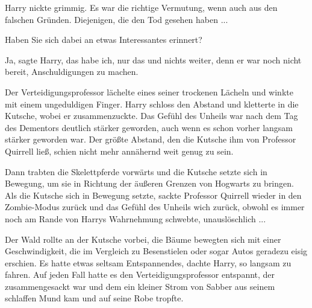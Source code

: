 Harry nickte grimmig. Es war die richtige Vermutung, wenn auch aus den falschen
Gründen. Diejenigen, die den Tod gesehen haben ...

\glqq{}Haben Sie sich dabei an etwas Interessantes erinnert?\grqq{}

\glqq{}Ja\grqq{}, sagte Harry, \glqq{}das habe ich\grqq{}, nur das und nichts
weiter, denn er war noch nicht bereit, Anschuldigungen zu machen.

Der Verteidigungsprofessor lächelte eines seiner trockenen Lächeln und winkte
mit einem ungeduldigen Finger. Harry schloss den Abstand und kletterte in die
Kutsche, wobei er zusammenzuckte. Das Gefühl des Unheils war nach dem Tag des
Dementors deutlich stärker geworden, auch wenn es schon vorher langsam stärker
geworden war. Der größte Abstand, den die Kutsche ihm von Professor Quirrell
ließ, schien nicht mehr annähernd weit genug zu sein.

Dann trabten die Skelettpferde vorwärts und die Kutsche setzte sich in Bewegung,
um sie in Richtung der äußeren Grenzen von Hogwarts zu bringen. Als die Kutsche
sich in Bewegung setzte, sackte Professor Quirrell wieder in den Zombie-Modus
zurück und das Gefühl des Unheils wich zurück, obwohl es immer noch am Rande von
Harrys Wahrnehmung schwebte, unauslöschlich ...

Der Wald rollte an der Kutsche vorbei, die Bäume bewegten sich mit einer
Geschwindigkeit, die im Vergleich zu Besenstielen oder sogar Autos geradezu
eisig erschien. Es hatte etwas seltsam Entspannendes, dachte Harry, so langsam
zu fahren. Auf jeden Fall hatte es den Verteidigungsprofessor entspannt, der
zusammengesackt war und dem ein kleiner Strom von Sabber aus seinem schlaffen
Mund kam und auf seine Robe tropfte.

